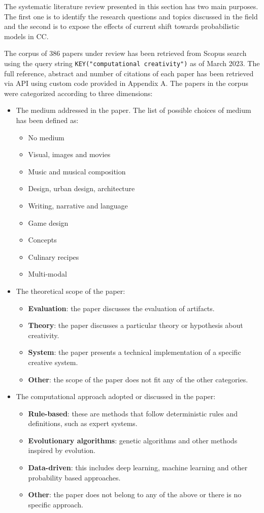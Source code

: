 The systematic literature review presented in this section has two main purposes. The first one is to identify the research questions and topics discussed in the field and the second is to expose the effects of current shift towards probabilistic models in CC.

The corpus of 386 papers under review has been retrieved from Scopus search using the query string \texttt{KEY("computational creativity")} as of March 2023. The full reference, abstract and number of citations of each paper has been retrieved via API using custom code provided in Appendix A. The papers in the corpus were categorized according to three dimensions:

 \begin{itemize}
 	\singlespacing
 	\item The medium addressed in the paper. The list of possible choices of medium has been defined as:
		\begin{itemize}
		\item No medium
		\item Visual, images and movies
		\item Music and musical composition
		\item Design, urban design, architecture
		\item Writing, narrative and language
		\item Game design
		\item Concepts
		\item Culinary recipes
		\item Multi-modal
		\end{itemize}
 	\item The theoretical scope of the paper:
		\begin{itemize}
		\item \textbf{Evaluation}: the paper discusses the evaluation of artifacts.
		\item \textbf{Theory}: the paper discusses a particular theory or hypothesis about creativity.
		\item  \textbf{System}: the paper presents a technical implementation of a specific creative system.
		\item  \textbf{Other}: the scope of the paper does not fit any of the other categories.
		\end{itemize}
	\item The computational approach adopted or discussed in the paper:
		\begin{itemize}
		\item \textbf{Rule-based}: these are methods that follow deterministic rules and definitions, such as expert systems.
		\item \textbf{Evolutionary algorithms}: genetic algorithms and other methods inspired by evolution.
		\item \textbf{Data-driven}: this includes deep learning, machine learning and other probability based approaches.
		\item \textbf{Other}: the paper does not belong to any of the above or there is no specific approach.
		\end{itemize}

 \end{itemize}

